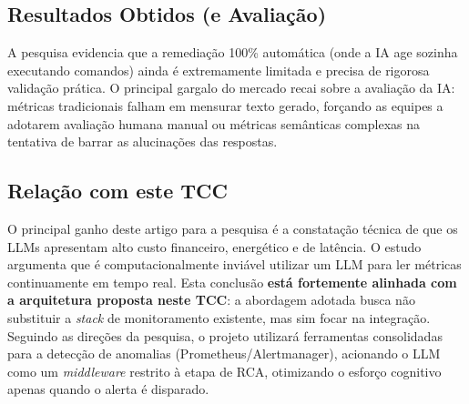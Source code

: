 \documentclass[12pt, a4paper]{article}
\begin{document}
\subsection*{Resultados Obtidos (e Avaliação)}
A pesquisa evidencia que a remediação 100\% automática (onde a IA age sozinha executando comandos) ainda é extremamente limitada e precisa de rigorosa validação prática. O principal gargalo do mercado recai sobre a avaliação da IA: métricas tradicionais falham em mensurar texto gerado, forçando as equipes a adotarem avaliação humana manual ou métricas semânticas complexas na tentativa de barrar as alucinações das respostas.

\subsection*{Relação com este TCC}
O principal ganho deste artigo para a pesquisa é a constatação técnica de que os LLMs apresentam alto custo financeiro, energético e de latência. O estudo argumenta que é computacionalmente inviável utilizar um LLM para ler métricas continuamente em tempo real. Esta conclusão \textbf{está fortemente alinhada com a arquitetura proposta neste TCC}: a abordagem adotada busca não substituir a \textit{stack} de monitoramento existente, mas sim focar na integração. Seguindo as direções da pesquisa, o projeto utilizará ferramentas consolidadas para a detecção de anomalias (Prometheus/Alertmanager), acionando o LLM como um \textit{middleware} restrito à etapa de RCA, otimizando o esforço cognitivo apenas quando o alerta é disparado.
\end{document}
